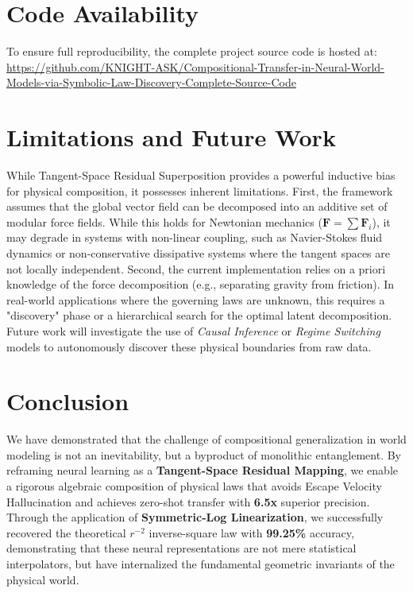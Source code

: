 \documentclass[twoside,11pt]{article}
\begin{document}
\section{Code Availability}
\label{sec:code}

To ensure full reproducibility, the complete project source code is hosted at: \\ \url{https://github.com/KNIGHT-ASK/Compositional-Transfer-in-Neural-World-Models-via-Symbolic-Law-Discovery-Complete-Source-Code}

\section{Limitations and Future Work}
\label{sec:limitations}
While Tangent-Space Residual Superposition provides a powerful inductive bias for physical composition, it possesses inherent limitations. First, the framework assumes that the global vector field can be decomposed into an additive set of modular force fields. While this holds for Newtonian mechanics ($\mathbf{F} = \sum \mathbf{F}_i$), it may degrade in systems with non-linear coupling, such as Navier-Stokes fluid dynamics or non-conservative dissipative systems where the tangent spaces are not locally independent. Second, the current implementation relies on a priori knowledge of the force decomposition (e.g., separating gravity from friction). In real-world applications where the governing laws are unknown, this requires a "discovery" phase or a hierarchical search for the optimal latent decomposition. Future work will investigate the use of \emph{Causal Inference} or \emph{Regime Switching} models to autonomously discover these physical boundaries from raw data.

\section{Conclusion}
\label{sec:conclusion}

We have demonstrated that the challenge of compositional generalization in world modeling is not an inevitability, but a byproduct of monolithic entanglement. By reframing neural learning as a \textbf{Tangent-Space Residual Mapping}, we enable a rigorous algebraic composition of physical laws that avoids Escape Velocity Hallucination and achieves zero-shot transfer with \textbf{6.5x} superior precision. Through the application of \textbf{Symmetric-Log Linearization}, we successfully recovered the theoretical $r^{-2}$ inverse-square law with \textbf{99.25\%} accuracy, demonstrating that these neural representations are not mere statistical interpolators, but have internalized the fundamental geometric invariants of the physical world.
\end{document}

